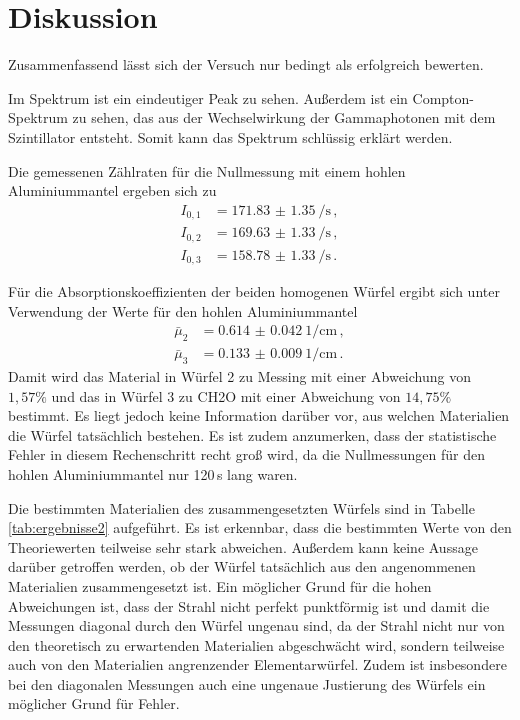 \section{Diskussion}
\label{sec:Diskussion}

Zusammenfassend lässt sich der Versuch nur bedingt als erfolgreich bewerten.

Im Spektrum ist ein eindeutiger Peak zu sehen. Außerdem ist ein Compton-Spektrum
zu sehen, das aus der Wechselwirkung der Gammaphotonen mit dem Szintillator entsteht.
Somit kann das Spektrum schlüssig erklärt werden.

Die gemessenen Zählraten für die Nullmessung mit einem hohlen Aluminiummantel
ergeben sich zu
\begin{align*}
  I_{0,1}&=\SI{171.83(135)}{\per\second} \,, \\
  I_{0,2}&=\SI{169.63(133)}{\per\second} \,, \\
  I_{0,3}&=\SI{158.78(133)}{\per\second} \,.
\end{align*}

Für die Absorptionskoeffizienten der beiden homogenen Würfel ergibt sich unter Verwendung der
Werte für den hohlen Aluminiummantel
\begin{align*}
  \bar{\mu}_2&= \SI{0.614(42)}{1\per \centi\metre}\,, \\
  \bar{\mu}_3&=\SI{0.133(9)}{1\per \centi\metre} \,.
\end{align*}
Damit wird das Material in Würfel 2 zu Messing mit einer Abweichung von $1{,}57\%$
und das in Würfel 3 zu CH2O mit einer Abweichung von $14{,}75\%$ bestimmt. Es liegt
jedoch keine Information darüber vor, aus welchen Materialien die Würfel tatsächlich bestehen.
Es ist zudem anzumerken, dass der statistische Fehler in diesem Rechenschritt recht groß
wird, da die Nullmessungen für den hohlen Aluminiummantel nur 120\,s lang waren.

Die bestimmten Materialien des zusammengesetzten Würfels sind in Tabelle \ref{tab:ergebnisse2}
aufgeführt. Es ist erkennbar, dass die bestimmten Werte von den Theoriewerten teilweise sehr stark abweichen. Außerdem kann keine Aussage darüber getroffen werden, ob der Würfel tatsächlich aus den angenommenen Materialien zusammengesetzt ist. Ein möglicher Grund für die hohen Abweichungen ist, dass der
Strahl nicht perfekt punktförmig ist und damit die Messungen diagonal durch den Würfel ungenau sind, da der Strahl nicht nur von den theoretisch zu erwartenden Materialien abgeschwächt wird, sondern teilweise auch von den Materialien angrenzender Elementarwürfel. Zudem ist insbesondere bei den diagonalen Messungen auch eine ungenaue Justierung des Würfels ein möglicher Grund für Fehler.
